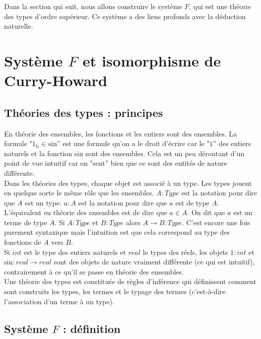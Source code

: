 \documentclass[a4paper,12pt]{article}
\theoremstyle{plain}
\begin{document}
Dans la section qui suit, nous allons construire le système $F$, qui
est une théorie des types d'ordre supérieur. Ce système a des liens
profonds avec la déduction naturelle.

\clearpage

\section{Système $F$ et isomorphisme de Curry-Howard}
\label{SF et CH}

\subsection{Théories des types : principes}

En théorie des ensembles, les fonctions et les entiers sont des ensembles. La formule "$1_\mathbb{N}\in \textrm{sin}$'' est une formule qu'on a le droit d'écrire car le "$1$'' des entiers naturels et la fonction \textrm{sin} sont des ensembles. Cela est un peu déroutant d'un point de vue intuitif car on "sent'' bien que ce sont des entités de nature différente.\\

Dans les théories des types, chaque objet est associé à un type. Les types jouent en quelque sorte le même rôle que les ensembles. $A : \mathit{Type}$ est la notation pour dire que $A$ est un type. $a:A$ est la notation pour dire que $a$ est de type $A$. L'équivalent en théorie des ensembles est de dire que $a \in A$. On dit que $a$ est un terme de type $A$. Si $A: \mathit{Type}$ et $B: \mathit{Type}$ alors $A \to B : \mathit{Type}$. C'est encore une fois purement syntaxique mais l'intuition est que cela correspond au type des fonctions de $A$ vers $B$.\\

Si $\textit{int}$ est le type des entiers naturels et $\textit{real}$ le types des réels, les objets $1 : \textit{int}$ et $\textrm{sin} : \textit{real} \to \textit{real}$ sont des objets de nature vraiment différente (ce qui est intuitif), contrairement à ce qu'il se passe en théorie des ensembles.\\

Une théorie des types est constituée de règles d'inférence qui définissent comment sont construits les types, les termes et le typage des termes (c'est-à-dire l'association d'un terme à un type).

\subsection{Système $F$ : définition}
\end{document}
